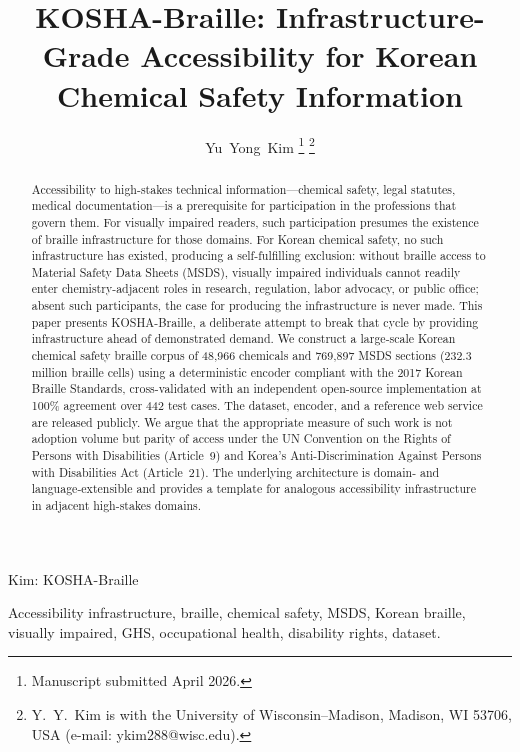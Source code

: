 \documentclass[journal]{IEEEtran}
\begin{document}
\title{KOSHA-Braille: Infrastructure-Grade Accessibility for Korean Chemical Safety Information}

\author{Yu~Yong~Kim
\thanks{Manuscript submitted April 2026.}
\thanks{Y.~Y.~Kim is with the University of Wisconsin--Madison, Madison, WI 53706, USA (e-mail: ykim288@wisc.edu).}
}

{Kim: KOSHA-Braille}

\begin{abstract}
Accessibility to high-stakes technical information---chemical safety, legal statutes, medical documentation---is a prerequisite for participation in the professions that govern them. For visually impaired readers, such participation presumes the existence of braille infrastructure for those domains. For Korean chemical safety, no such infrastructure has existed, producing a self-fulfilling exclusion: without braille access to Material Safety Data Sheets (MSDS), visually impaired individuals cannot readily enter chemistry-adjacent roles in research, regulation, labor advocacy, or public office; absent such participants, the case for producing the infrastructure is never made. This paper presents KOSHA-Braille, a deliberate attempt to break that cycle by providing infrastructure ahead of demonstrated demand. We construct a large-scale Korean chemical safety braille corpus of 48,966 chemicals and 769,897 MSDS sections (232.3 million braille cells) using a deterministic encoder compliant with the 2017 Korean Braille Standards, cross-validated with an independent open-source implementation at 100\% agreement over 442 test cases. The dataset, encoder, and a reference web service are released publicly. We argue that the appropriate measure of such work is not adoption volume but parity of access under the UN Convention on the Rights of Persons with Disabilities (Article~9) and Korea's Anti-Discrimination Against Persons with Disabilities Act (Article~21). The underlying architecture is domain- and language-extensible and provides a template for analogous accessibility infrastructure in adjacent high-stakes domains.
\end{abstract}

\begin{keywords}
Accessibility infrastructure, braille, chemical safety, MSDS, Korean braille, visually impaired, GHS, occupational health, disability rights, dataset.
\end{keywords}

\titlepgskip=-15pt
\end{document}
